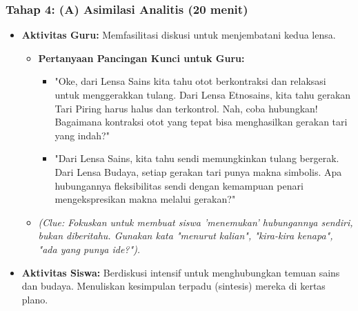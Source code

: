 \documentclass[a4paper,12pt]{article}
\begin{document}
\subsubsection{Tahap 4: (A) Asimilasi Analitis (20 menit)}
\begin{itemize}
\item \textbf{Aktivitas Guru:} Memfasilitasi diskusi untuk menjembatani kedua lensa.
    \begin{itemize}
    \item \textbf{Pertanyaan Pancingan Kunci untuk Guru:}
        \begin{itemize}
        \item "Oke, dari Lensa Sains kita tahu otot berkontraksi dan relaksasi untuk menggerakkan tulang. Dari Lensa Etnosains, kita tahu gerakan Tari Piring harus halus dan terkontrol. Nah, coba hubungkan! Bagaimana kontraksi otot yang tepat bisa menghasilkan gerakan tari yang indah?"
        \item "Dari Lensa Sains, kita tahu sendi memungkinkan tulang bergerak. Dari Lensa Budaya, setiap gerakan tari punya makna simbolis. Apa hubungannya fleksibilitas sendi dengan kemampuan penari mengekspresikan makna melalui gerakan?"
        \end{itemize}
    \item \textit{(Clue: Fokuskan untuk membuat siswa 'menemukan' hubungannya sendiri, bukan diberitahu. Gunakan kata "menurut kalian", "kira-kira kenapa", "ada yang punya ide?").}
    \end{itemize}
\item \textbf{Aktivitas Siswa:} Berdiskusi intensif untuk menghubungkan temuan sains dan budaya. Menuliskan kesimpulan terpadu (sintesis) mereka di kertas plano.
\end{itemize}
\end{document}
